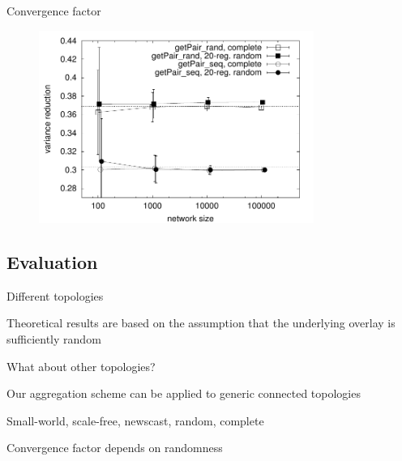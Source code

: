 \begin{frame}{Convergence factor}

\begin{figure}
	\includegraphics[width=0.80\textwidth]{figs/11/rate-av}
\end{figure}

\end{frame}

\subsection{Evaluation}

\begin{frame}{Different topologies}
	
\BIL
\item Theoretical results are based on the assumption that the underlying overlay is  sufficiently random
\item What about other topologies?
\BI
\item Our aggregation scheme can be applied to generic connected topologies
\item Small-world, scale-free, newscast, random, complete
\item Convergence factor depends on randomness
\EI
\EIL
\end{frame}

